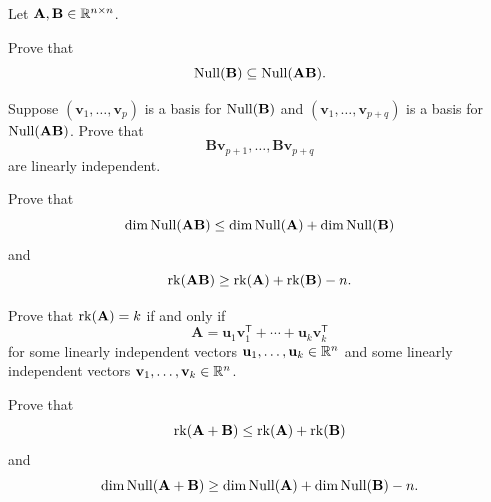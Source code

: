 \begin{problem}
Let $\mathbf A,\mathbf B\in\mathbb{R}^{n\times n}$.
\begin{problemsubparts}
\item Prove that
\[
\operatorname{Null}(\mathbf B)\subseteq\operatorname{Null}(\mathbf A\mathbf B).
\]
\item Suppose $(\mathbf v_1,\dots,\mathbf v_p)$ is a basis for $\operatorname{Null}(\mathbf B)$ and $(\mathbf v_1,\dots,\mathbf v_{p+q})$ is a basis for $\operatorname{Null}(\mathbf A\mathbf B)$. Prove that
\[
\mathbf B\mathbf v_{p+1},\dots,\mathbf B\mathbf v_{p+q}
\]
are linearly independent.
\item Prove that
\[
\dim\operatorname{Null}(\mathbf A\mathbf B)\le \dim\operatorname{Null}(\mathbf A)+\dim\operatorname{Null}(\mathbf B)
\]
and
\[
\operatorname{rk}(\mathbf A\mathbf B)\ge \operatorname{rk}(\mathbf A)+\operatorname{rk}(\mathbf B)-n.
\]
\item Prove that $\operatorname{rk}(\mathbf A)=k$ if and only if
\[
\mathbf A=\mathbf u_1\mathbf v_1^{\mathsf T}+\cdots+\mathbf u_k\mathbf v_k^{\mathsf T}
\]
for some linearly independent vectors $\mathbf u_1,\dots,\mathbf u_k\in\mathbb{R}^n$ and some linearly independent vectors $\mathbf v_1,\dots,\mathbf v_k\in\mathbb{R}^n$.
\item Prove that
\[
\operatorname{rk}(\mathbf A+\mathbf B)\le \operatorname{rk}(\mathbf A)+\operatorname{rk}(\mathbf B)
\]
and
\[
\dim\operatorname{Null}(\mathbf A+\mathbf B)\ge \dim\operatorname{Null}(\mathbf A)+\dim\operatorname{Null}(\mathbf B)-n.
\]
\end{problemsubparts}
\end{problem}

